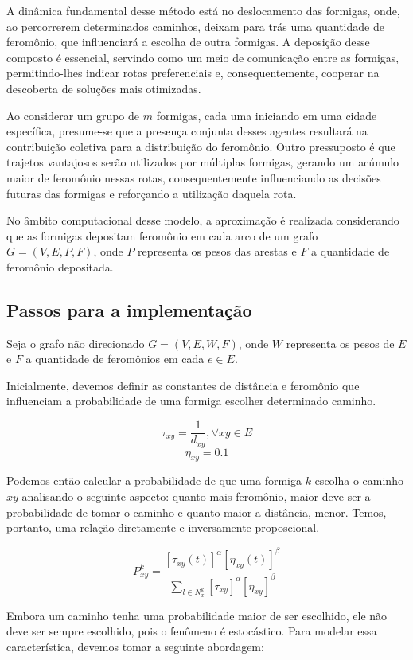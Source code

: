 \documentclass[12pt]{article}
\begin{document}
A dinâmica fundamental desse método está no deslocamento das formigas, onde, ao percorrerem determinados caminhos, deixam para trás uma quantidade de feromônio, que influenciará a escolha de outra formigas. A deposição desse composto é essencial, servindo como um meio de comunicação entre as formigas, permitindo-lhes indicar rotas preferenciais e, consequentemente, cooperar na descoberta de soluções mais otimizadas.

Ao considerar um grupo de $m$ formigas, cada uma iniciando em uma cidade específica, presume-se que a presença conjunta desses agentes resultará na contribuição coletiva para a distribuição do feromônio. Outro pressuposto  é que trajetos vantajosos serão utilizados por múltiplas formigas, gerando um acúmulo maior de feromônio nessas rotas, consequentemente influenciando as decisões futuras das formigas e reforçando a utilização daquela rota.

No âmbito computacional desse modelo, a aproximação é realizada considerando que as formigas depositam feromônio em cada arco de um grafo $G = (V, E, P, F)$, onde $P$ representa os pesos das arestas e $F$ a quantidade de feromônio depositada.  


\subsection{Passos para a implementação}
Seja o grafo não direcionado $G=(V, E, W, F)$, onde $W$ representa os pesos de $E$ e $F$ a quantidade de feromônios em cada $e \in E$. 

Inicialmente, devemos definir as constantes de distância e feromônio que influenciam a probabilidade de uma formiga escolher determinado caminho. 

$$\tau_{xy} = \frac{1}{d_{xy}}, \forall xy \in E$$
$$\eta_{xy} = 0.1$$

Podemos então calcular a probabilidade de que uma formiga $k$ escolha o caminho $xy$ analisando o seguinte aspecto: quanto mais feromônio, maior deve ser a probabilidade de tomar o caminho e quanto maior a distância, menor. Temos, portanto, uma relação diretamente e inversamente proposcional. 

$$P^k_{xy} = \frac{[\tau_{xy}(t)]^\alpha [\eta_{xy}(t)]^\beta}{\sum_{l \in N^k_x} [\tau_{xy}]^\alpha[\eta_{xy}]^\beta}$$

Embora um caminho tenha uma probabilidade maior de ser escolhido, ele não deve ser sempre escolhido, pois o fenômeno é estocástico. Para modelar essa característica, devemos tomar a seguinte abordagem: 
\end{document}
